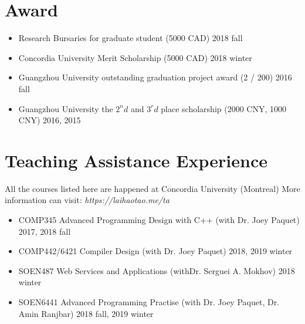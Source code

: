 \documentclass[11pt,a4paper,sans]{moderncv}
\begin{document}
\section{Award}

\begin{itemize}

\item Research Bursaries for graduate student (5000 CAD) \hfill 2018 fall

\item Concordia University Merit Scholarship (5000 CAD) \hfill 2018 winter

\item Guangzhou University outstanding graduation project award (2 / 200) \hfill 2016 fall

\item Guangzhou University the $2^nd$ and $3^rd$ place scholarship (2000 CNY, 1000 CNY) \hfill 2016, 2015

\end{itemize}

\section{Teaching Assistance Experience}
All the courses listed here are happened at Concordia University (Montreal)
\newline More information can visit: {\textit{https://laihaotao.me/ta}}
\vspace{2pt}
\begin{itemize}
\item COMP345 Advanced Programming Design with C++ (with Dr. Joey Paquet) \hfill 2017, 2018 fall
\vspace{1pt}

\item COMP442/6421 Compiler Design (with Dr. Joey Paquet) \hfill 2018, 2019 winter
\vspace{1pt}

\item SOEN487 Web Services and Applications (withDr. Serguei A. Mokhov) \hfill 2018 winter
\vspace{1pt}

\item SOEN6441 Advanced Programming Practise (with Dr. Joey Paquet, Dr. Amin Ranjbar) \hfill 2018 fall, 2019 winter
\vspace{1pt}
\end{itemize}
\end{document}
